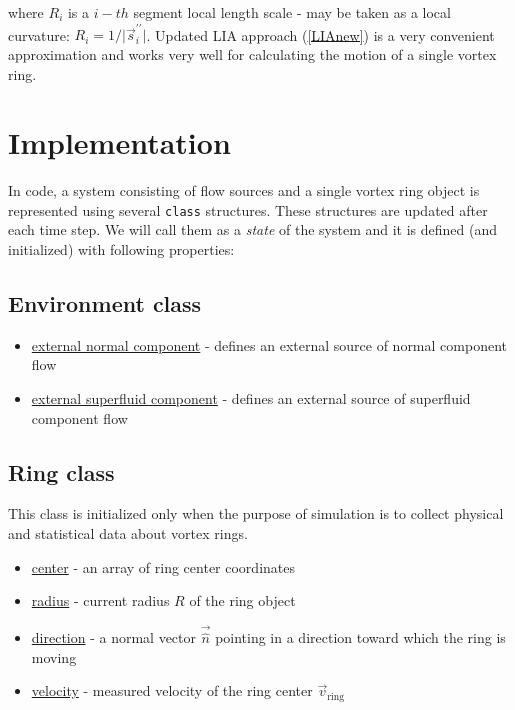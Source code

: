 where $R_i$ is a $i-th$ segment local length scale - may be taken \cite{barenghi} as a local curvature: $R_i = 1 / \vert \vec{s}^{\prime \prime}_i \vert$. Updated LIA approach (\ref{LIAnew}) is a very convenient approximation and works very well for calculating the motion of a single vortex ring.

\section{Implementation}

In code, a system consisting of flow sources and a single vortex ring object is represented using several \texttt{class} structures. These structures are updated after each time step. We will call them as a \textit{state} of the system and it is defined (and initialized) with following properties:


\subsection*{Environment class}

\begin{itemize}
	\item \underline{external normal component} - defines an external source of normal component flow
	\item \underline{external superfluid component} - defines an external source of superfluid component flow
\end{itemize}

\subsection*{Ring class}

This class is initialized only when the purpose of simulation is to collect physical and statistical data about vortex rings.

\begin{itemize}
	\item \underline{center} - an array of ring center coordinates
	\item \underline{radius} - current radius $R$ of the ring object
	\item \underline{direction} - a normal vector $\vec{\hat{n}}$ pointing in a direction toward which the ring is moving
	\item \underline{velocity} - measured velocity of the ring center $\vec{v}_{\text{ring}}$
\end{itemize}


